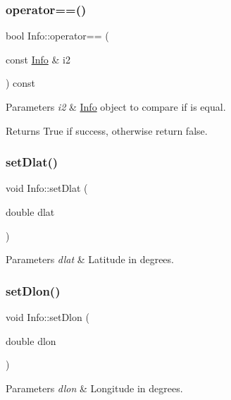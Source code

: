 \subsubsection{\texorpdfstring{operator==()}{operator==()}}
{\footnotesize\ttfamily bool Info\+::operator== (\begin{DoxyParamCaption}\item[{const \hyperlink{class_info}{Info} \&}]{i2 }\end{DoxyParamCaption}) const}


\begin{DoxyParams}{Parameters}
{\em i2} & \hyperlink{class_info}{Info} object to compare if is equal.\\
\hline
\end{DoxyParams}
\begin{DoxyReturn}{Returns}
True if success, otherwise return false. 
\end{DoxyReturn}
\mbox{\label{class_info_adb15b65c585c268ab6c93a618a38b43c}} 
\subsubsection{\texorpdfstring{set\+Dlat()}{setDlat()}}
{\footnotesize\ttfamily void Info\+::set\+Dlat (\begin{DoxyParamCaption}\item[{double}]{dlat }\end{DoxyParamCaption})}


\begin{DoxyParams}{Parameters}
{\em dlat} & Latitude in degrees. \\
\hline
\end{DoxyParams}
\mbox{\label{class_info_ac0009b3522d2a87e589961c7154dfbca}} 
\subsubsection{\texorpdfstring{set\+Dlon()}{setDlon()}}
{\footnotesize\ttfamily void Info\+::set\+Dlon (\begin{DoxyParamCaption}\item[{double}]{dlon }\end{DoxyParamCaption})}


\begin{DoxyParams}{Parameters}
{\em dlon} & Longitude in degrees. \\
\hline
\end{DoxyParams}
\mbox{\label{class_info_a88de44a5733caaeae720af118567c34c}} 
